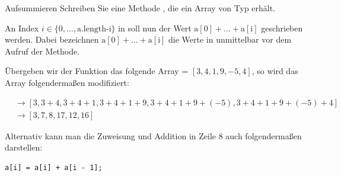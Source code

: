 \documentclass{../tuda-exercise}
\begin{document}
  \begin{task}[credit=\stars{2}{3}]{Aufsummieren}
    Schreiben Sie eine Methode , die ein Array  von
    Typ erhält.

    \br

    An Index \(i \in \{0, \dots, \text{a.length-i}\}\) in  soll nun der Wert
    \(\text{a}[0] + \dots + \text{a}[\text{i}]\) geschrieben werden. Dabei bezeichnen
    \(\text{a}[0] + \dots + \text{a}[\text{i}]\) die Werte in  unmittelbar vor dem
    Aufruf der Methode.

    \br

    Übergeben wir der Funktion das folgende Array  = \([3, 4, 1, 9, -5, 4]\), so
    wird das Array folgendermaßen modifiziert:

    \begin{align*}
      & \rightarrow [3, 3 + 4, 3 + 4 + 1, 3 + 4 + 1 + 9, 3 + 4 + 1 + 9 + (-5),
      3 + 4 + 1 + 9 + (-5) + 4]
      \\
      & \rightarrow [3, 7, 8, 17, 12, 16]
    \end{align*}

    \begin{solution}
      

      \begin{note}[title=Information:]
        Alternativ kann man die Zuweisung und Addition in Zeile 8 auch folgendermaßen darstellen:

        \begin{lstlisting}[style=Java]
					a[i] = a[i] + a[i - 1];
        \end{lstlisting}
      \end{note}
    \end{solution}
  \end{task}

  \clearpage
\end{document}
